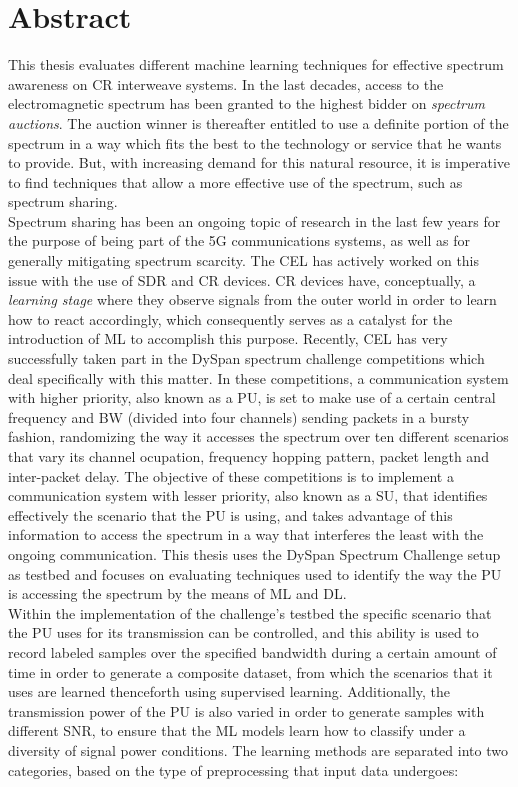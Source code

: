 \chapter*{Abstract}

This thesis evaluates different machine learning techniques for effective spectrum awareness on \ac{CR} interweave systems. In the last decades, access to the electromagnetic spectrum has been granted to the highest bidder on \emph{spectrum auctions}. The auction winner is thereafter entitled to use a definite portion of the spectrum in a way which fits the best to the technology or service that he wants to provide. But, with increasing demand for this natural resource, it is imperative to find techniques that allow a more effective use of the spectrum, such as spectrum sharing.\\

Spectrum sharing has been an ongoing topic of research in the last few years for the purpose of being part of the 5G communications systems, as well as for generally mitigating spectrum scarcity. The \ac{CEL} has actively worked on this issue with the use of \ac{SDR} and \ac{CR} devices. \ac{CR} devices have, conceptually, a \emph{learning stage} where they observe signals from the outer world in order to learn how to react accordingly, which consequently serves as a catalyst for the introduction of \ac{ML} to accomplish this purpose. Recently, \ac{CEL} has very successfully taken part in the \ac{DySpan} spectrum challenge competitions which deal specifically with this matter. In these competitions, a communication system with higher priority, also known as a \ac{PU}, is set to make use of a certain central frequency and \ac{BW} (divided into four channels) sending packets in a bursty fashion, randomizing the way it accesses the spectrum over ten different scenarios that vary its channel ocupation, frequency hopping pattern, packet length and inter-packet delay. The objective of these competitions is to implement a communication system with lesser priority, also known as a \ac{SU}, that identifies effectively the scenario that the \ac{PU} is using, and takes advantage of this information to access the spectrum in a way that interferes the least with the ongoing communication. This thesis uses the DySpan Spectrum Challenge setup as testbed and focuses on evaluating techniques used to identify the way the \ac{PU} is accessing the spectrum by the means of \ac{ML} and \ac{DL}.\\

Within the implementation of the challenge's testbed the specific scenario that the \ac{PU} uses for its transmission can be controlled, and this ability is used to record labeled samples over the specified bandwidth during a certain amount of time in order to generate a composite dataset, from which the scenarios that it uses are learned thenceforth using supervised learning. Additionally, the transmission power of the \ac{PU} is also varied in order to generate samples with different \ac{SNR}, to ensure that the \ac{ML} models learn how to classify under a diversity of signal power conditions. The learning methods are separated into two categories, based on the type of preprocessing that input data undergoes:

